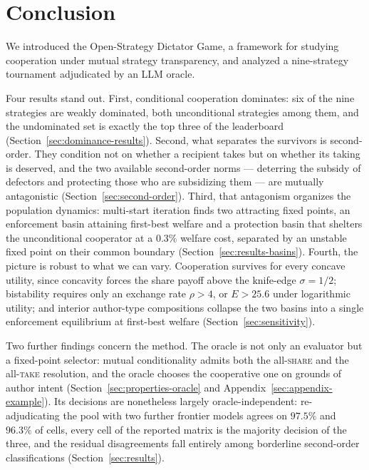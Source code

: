 \documentclass[11pt]{article}
\begin{document}
\section{Conclusion}

We introduced the Open-Strategy Dictator Game, a framework for
studying cooperation under mutual strategy transparency, and
analyzed a nine-strategy tournament adjudicated by an LLM oracle.

Four results stand out.
First, conditional cooperation dominates: six of the nine strategies
are weakly dominated, both unconditional strategies among them, and
the undominated set is exactly the top three of the leaderboard
(Section~\ref{sec:dominance-results}).
Second, what separates the survivors is second-order.  They
condition not on whether a recipient takes but on whether its taking
is deserved, and the two available second-order norms --- deterring
the subsidy of defectors and protecting those who are subsidizing
them --- are mutually antagonistic
(Section~\ref{sec:second-order}).
Third, that antagonism organizes the population dynamics: multi-start
iteration finds two attracting fixed points, an enforcement basin
attaining first-best welfare and a protection basin that shelters the
unconditional cooperator at a $0.3\%$ welfare cost, separated by an
unstable fixed point on their common boundary
(Section~\ref{sec:results-basins}).
Fourth, the picture is robust to what we can vary.  Cooperation
survives for every concave utility, since concavity forces the share
payoff above the knife-edge $\sigma = 1/2$; bistability requires only
an exchange rate $\rho > 4$, or $E > 25.6$ under logarithmic utility;
and interior author-type compositions collapse the two basins into a
single enforcement equilibrium at first-best welfare
(Section~\ref{sec:sensitivity}).

Two further findings concern the method.  The oracle is not only an
evaluator but a fixed-point selector: mutual conditionality admits
both the all-\textup{\textsc{share}} and the all-\textup{\textsc{take}}
resolution, and the oracle chooses the cooperative one on grounds of
author intent (Section~\ref{sec:properties-oracle} and
Appendix~\ref{sec:appendix-example}).
Its decisions are nonetheless largely oracle-independent:
re-adjudicating the pool with two further frontier models agrees on
$97.5\%$ and $96.3\%$ of cells, every cell of the reported matrix is
the majority decision of the three, and the residual disagreements
fall entirely among borderline second-order classifications
(Section~\ref{sec:results}).
\end{document}
